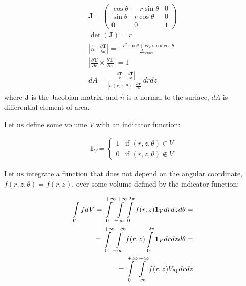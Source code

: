 \documentclass[10pt, a4paper]{article}
\begin{document}
\begin{multicols}{2}
\begin{gather}
    \bm{J} = 
    \begin{pmatrix}
        \cos{\theta} & -r\sin\theta & 0 \\
        \sin{\theta} &  r\cos\theta & 0 \\
        0           & 0            & 1
    \end{pmatrix}\\
    \det(\bm{J}) = r \\
    \left| \hat{n} \cdot \frac{\partial \bm{T}}{\partial \theta} \right| = \frac{-r^2 \sin \theta + r r_c \sin \theta \cos \theta}{\Delta_{\textrm{center}}}\\
    \left| \frac{\partial \bm{T}}{\partial r} \times \frac{\partial \bm{T}}{\partial z} \right| = 1\\
    dA = \frac{\left|\frac{\partial \bm{T}}{\partial r} \times \frac{\partial \bm{T}}{\partial z} \right|}{\left|\hat{n}(r, z, \theta) \cdot \frac{\partial\bm{T}}{\partial \theta}\right|} dr dz
\end{gather}
where $\bm{J}$ is the Jacobian matrix, and $\hat{n}$ is a normal to the surface, $dA$ is differential element of area.

Let us define some volume $V$ with an indicator function:

\begin{eqnarray}
    \bm{1}_V =
    \begin{cases}
        1 & \text{if } (r, z, \theta) \in V\\
        0 & \text{if } (r, z, \theta) \notin V
    \end{cases}
\end{eqnarray}

Let us integrate a function that does not depend on the angular coordinate, $f(r, z, \theta) = f(r, z)$, over some volume defined by the indicator function:

\begin{eqnarray}
    \label{eq:int_indicator_V}
    \begin{split}
        \int\limits_{V} f dV
        =\int\displaylimits_{0}^{+\infty} \int\displaylimits_{-\infty}^{+\infty} \int\displaylimits_{0}^{2\pi} f(r, z) \bm{1}_V  dr dz d\theta =\\
        =\int\displaylimits_{0}^{+\infty} \int\displaylimits_{-\infty}^{+\infty} f(r, z) \int\displaylimits_{0}^{2\pi}  \bm{1}_V dr dz d\theta =\\
        =\int\displaylimits_{0}^{+\infty} \int\displaylimits_{-\infty}^{+\infty} f(r, z)  V_{\theta \downarrow} dr dz
    \end{split}
\end{eqnarray}


\end{multicols}
\end{document}
